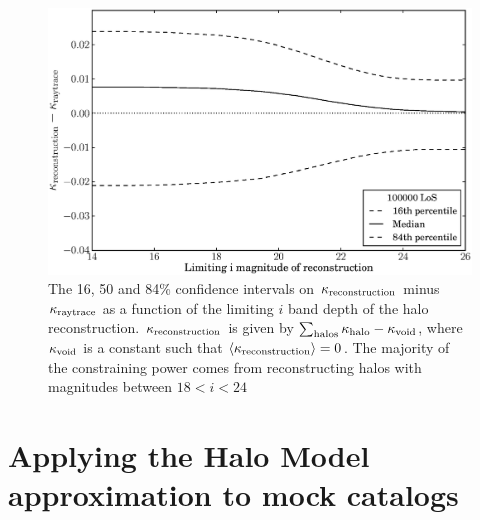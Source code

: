 \documentclass[useAMS,usenatbib]{mn2e}
\begin{document}
\begin{figure}
\includegraphics[width=\columnwidth]{figs/mag_scatter.eps}
\caption[magcut]{The 16, 50 and 84\% confidence intervals on $\kappa_{\rm reconstruction}$ minus $\kappa_{\rm raytrace}$ as a function of the limiting $i$ band depth of the halo reconstruction. $\kappa_{\rm reconstruction}$ is given by $\sum_{\rm halos} \kappa_{\rm halo}-\kappa_{\rm void}$, where $\kappa_{\rm void}$ is a constant such that $\left\langle\kappa_{\rm reconstruction}\right\rangle=0$. The majority of the constraining power comes from reconstructing halos with magnitudes between $18<i<24$}
\label{fig:magcut}
\end{figure}




\section{Applying the Halo Model approximation to mock catalogs}
\label{sec:obsMstar+z}
\end{document}
